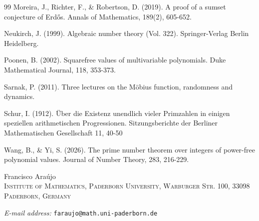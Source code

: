 \documentclass[a4paper,11pt,reqno]{amsart}
\theoremstyle{plain}
\theoremstyle{remark}
\begin{document}
\begin{thebibliography}{99}
					Moreira, J., Richter, F., \& Robertson, D. (2019). A proof of a sumset conjecture of Erdős. Annals of Mathematics, 189(2), 605-652.
					
					Neukirch, J. (1999). Algebraic number theory (Vol. 322).  Springer-Verlag Berlin Heidelberg.
					
					
					Poonen, B. (2002). Squarefree values of multivariable polynomials. Duke Mathematical Journal, 118, 353-373.
					
					Sarnak, P. (2011). Three lectures on the Möbius function, randomness and dynamics.
					
					
					Schur, I. (1912). Über die Existenz unendlich vieler Primzahlen in einigen speziellen arithmetischen Progressionen. Sitzungsberichte der Berliner Mathematischen Gesellschaft 11, 40-50
					
					
					Wang, B., \& Yi, S. (2026). The prime number theorem over integers of power-free polynomial values. Journal of Number Theory, 283, 216-229.

					
					
					
					
					
					
					
					
					
					
					
				\end{thebibliography}
			
			\bigskip
			\footnotesize
			\noindent
			Francisco Ara\'{u}jo\\
			\textsc{Institute of Mathematics, Paderborn University, Warburger Str. 100, 33098 Paderborn, Germany}\par\nopagebreak
			\noindent
			\textit{E-mail address:} \texttt{faraujo@math.uni-paderborn.de}
				
				
				
				
				
			
\end{document}
